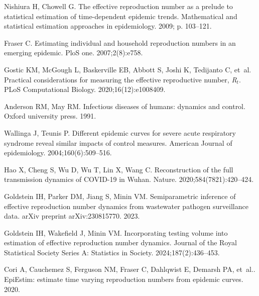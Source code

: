 \documentclass[10pt,letterpaper]{article}
\begin{document}
\begin{thebibliography}{10}

  Nishiura H, Chowell G.
  \newblock The effective reproduction number as a prelude to statistical
    estimation of time-dependent epidemic trends.
  \newblock Mathematical and statistical estimation approaches in epidemiology.
    2009; p. 103--121.
  
  Fraser C.
  \newblock Estimating individual and household reproduction numbers in an
    emerging epidemic.
  \newblock PloS one. 2007;2(8):e758.
  
  Gostic KM, McGough L, Baskerville EB, Abbott S, Joshi K, Tedijanto C, et~al.
  \newblock Practical considerations for measuring the effective reproductive
    number, \emph{R}$_t$.
  \newblock PLoS Computational Biology. 2020;16(12):e1008409.
  
  Anderson RM, May RM.
  \newblock Infectious diseases of humans: dynamics and control.
  \newblock Oxford university press. 1991.
  
  Wallinga J, Teunis P.
  \newblock Different epidemic curves for severe acute respiratory syndrome
    reveal similar impacts of control measures.
  \newblock American Journal of epidemiology. 2004;160(6):509--516.
  
  Hao X, Cheng S, Wu D, Wu T, Lin X, Wang C.
  \newblock Reconstruction of the full transmission dynamics of COVID-19 in
    Wuhan.
  \newblock Nature. 2020;584(7821):420--424.
  
  Goldstein IH, Parker DM, Jiang S, Minin VM.
  \newblock Semiparametric inference of effective reproduction number dynamics
    from wastewater pathogen surveillance data.
  \newblock arXiv preprint arXiv:230815770. 2023.
  
  Goldstein IH, Wakefield J, Minin VM.
  \newblock Incorporating testing volume into estimation of effective
    reproduction number dynamics.
  \newblock Journal of the Royal Statistical Society Series A: Statistics in
    Society. 2024;187(2):436--453.
  
  Cori A, Cauchemez S, Ferguson NM, Fraser C, Dahlqwist E, Demarsh PA, et~al..
    {EpiEstim}: estimate time varying reproduction numbers from epidemic curves.
    2020.
  

\end{thebibliography}
\end{document}
